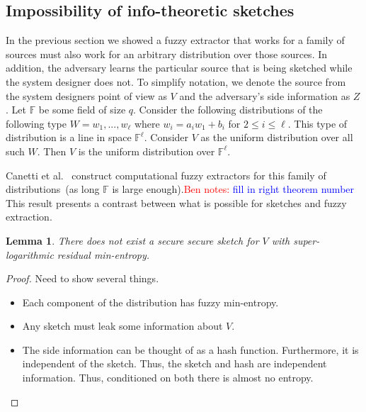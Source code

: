 \documentclass[11pt]{article}
\newtheorem{lemma}[theorem]{Lemma}
\newcommand{\authnote}[2]{{\textcolor{red}{\textsf{#1 notes: }\textcolor{blue}{ #2}}\marginpar{\textcolor{red}{\textbf{!!!!!}}}}}
\newcommand{\authnote}[2]{}
\newcommand{\bnote}[1]{{\authnote{Ben}{#1}}}
\begin{document}



\subsection{Impossibility of info-theoretic sketches}
In the previous section we showed a fuzzy extractor that works for a family of sources must also work for an arbitrary distribution over those sources.  In addition, the adversary learns the particular source that is being sketched while the system designer does not.  To simplify notation, we denote the source from the system designers point of view as $V$ and the adversary's side information as $Z$.  Let $\mathbb{F}$ be some field of size $q$.  Consider the following distributions of the following type $W = w_1,..., w_\ell$ where $w_i = a_i w_1 + b_i$ for $2\le i \le \ell$.  This type of distribution is a line in space $\mathbb{F}^\ell$.  Consider $V$ as the uniform distribution over all such $W$.  Then $V$ is the uniform distribution over $\mathbb{F}^\ell$.

Canetti et al.~\cite[XXXX]{canetti2014key} construct computational fuzzy extractors for this family of distributions~(as long $\mathbb{F}$ is large enough).\bnote{fill in right theorem number}  This result presents a contrast between what is possible for sketches and fuzzy extraction.

\begin{lemma}
There does not exist a secure secure sketch for $V$ with super-logarithmic residual min-entropy.
\end{lemma}
\begin{proof}
Need to show several things.  
\begin{itemize}
\item Each component of the distribution has fuzzy min-entropy.
\item Any sketch must leak some information about $V$.
\item The side information can be thought of as a hash function.  Furthermore, it is independent of the sketch.  Thus, the sketch and hash are independent information.  Thus, conditioned on both there is almost no entropy.
\end{itemize}
\end{proof}
\end{document}
